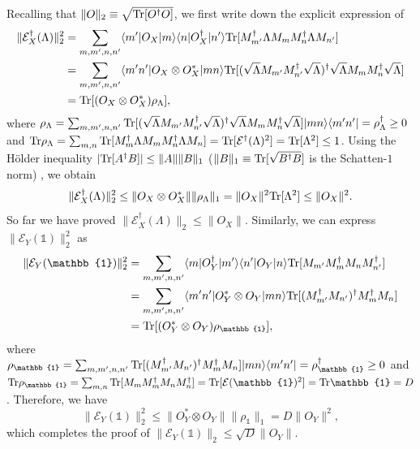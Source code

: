 \documentclass{tADP2e}
\theoremstyle{plain}
\theoremstyle{plain}
\theoremstyle{definition}
\begin{document}
\begin{appendices}
Recalling that $\|O\|_2\equiv\sqrt{{\rm Tr}[O^\dag O]}$, we first write down the explicit expression of
\begin{equation}
\begin{split}
\|\mathcal{E}_X^\dag (\Lambda)\|_2^2&=%
\sum_{m,m',n,n'}\langle m'|O_X|m\rangle\langle n|O_X^\dag|n'\rangle {\rm Tr}[M_{m'}^\dag\Lambda M_m M_n^\dag\Lambda M_{n'}] \\
&=\sum_{m,m',n,n'}\langle m'n'|O_X\otimes O_X^*|mn\rangle{\rm Tr}[(\sqrt{\Lambda}M_{m'}M_{n'}^\dag\sqrt{\Lambda})^\dag\sqrt{\Lambda}M_mM_n^\dag\sqrt{\Lambda}] \\
&={\rm Tr}[(O_X\otimes O_X^*)\rho_\Lambda],
\end{split}
\end{equation}
where $\rho_\Lambda=\sum_{m,m',n,n'}{\rm Tr}[(\sqrt{\Lambda}M_{m'}M_{n'}^\dag\sqrt{\Lambda})^\dag\sqrt{\Lambda}M_mM_n^\dag\sqrt{\Lambda}]|mn\rangle\langle m'n'|= \rho_\Lambda^\dag\ge0$ and ${\rm Tr}\rho_\Lambda=\sum_{m,n}{\rm Tr}[M_m^\dag\Lambda M_m M_n^\dag\Lambda M_n]={\rm Tr}[\mathcal{E}^\dag(\Lambda)^2]={\rm Tr}[\Lambda^2]\le 1$. Using the H\"older inequality $|{\rm Tr}[A^\dag B]|\le \|A\|\|B\|_1$ ($\|B\|_1\equiv{\rm Tr}[\sqrt{B^\dag B}]$ is the Schatten-$1$ norm) \cite{BB11}, we obtain
\begin{equation}
\|\mathcal{E}_X^\dag (\Lambda)\|_2^2\le \|O_X\otimes O_X^*\| \|\rho_\Lambda\|_1=\|O_X\|^2{\rm Tr}[\Lambda^2]\le \|O_X\|^2.
\end{equation}
So far we have proved $\|\mathcal{E}_X^\dag (\Lambda)\|_2\le\|O_X\|$. Similarly, we can express $\|\mathcal{E}_Y(\mathbb{1})\|_2^2$ as
\begin{equation}
\begin{split}
\|\mathcal{E}_Y(\mathbb{1})\|_2^2&=\sum_{m,m',n,n'}\langle m|O_Y^\dag|m'\rangle\langle n'|O_Y|n\rangle {\rm Tr}[M_{m'} M_m^\dag M_n M_{n'}^\dag] \\
&=\sum_{m,m',n,n'}\langle m'n'|O_Y^*\otimes O_Y|mn\rangle {\rm Tr}[(M_{m'}^\dag M_{n'})^\dag  M_m^\dag M_n ] \\
&={\rm Tr}[(O_Y^*\otimes O_Y)\rho_{\mathbb{1}}],
\end{split}
\end{equation}
where $\rho_{\mathbb{1}}=\sum_{m,m',n,n'}{\rm Tr}[(M_{m'}^\dag M_{n'})^\dag  M_m^\dag M_n]|mn\rangle \langle m'n'|=\rho_{\mathbb{1}}^\dag\ge0$ and ${\rm Tr}\rho_{\mathbb{1}}=\sum_{m,n}{\rm Tr}[M_mM_m^\dag M_n M_n^\dag]={\rm Tr}[\mathcal{E}(\mathbb{1})^2]={\rm Tr}\mathbb{1}=D$. Therefore, we have
\begin{equation}
\|\mathcal{E}_Y(\mathbb{1})\|_2^2\le \|O_Y^*\otimes O_Y\| \|\rho_{\mathbb{1}}\|_1= D\|O_Y\|^2,
\end{equation}
which completes the proof of $\|\mathcal{E}_Y(\mathbb{1})\|_2\le\sqrt{D}\|O_Y\|$.


\end{appendices}
\end{document}
